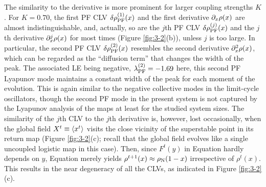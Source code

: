 \documentclass[12pt]{iopart}
\begin{document}
The similarity to the derivative is more prominent
 for larger coupling strengths $K$.
For $K=0.70$, the first PF CLV $\delta\rho_{\rm PF}^{(1)}(x)$
 and the first derivative $\partial_x\rho(x)$ are almost indistinguishable,
 and, actually, so are the $j$th PF CLV $\delta\rho_{\rm PF}^{(j)}(x)$
 and the $j$th derivative $\partial_x^j\rho(x)$ for most times
 (Figure \ref{fig:3-2}(b)), unless $j$ is too large.
In particular, the second PF CLV $\delta\rho_{\rm PF}^{(2)}(x)$ resembles
 the second derivative $\partial_x^2\rho(x)$,
 which can be regarded as the ``diffusion term'' that changes the width
 of the peak.
The associated LE being negative, $\lambda_{\rm PF}^{(2)} = -1.69$ here,
 this second PF Lyapunov mode maintains a constant width of the peak
 for each moment of the evolution.
This is again similar to the negative collective modes
 in the limit-cycle oscillators, though the second PF mode
 in the present system is not captured by the Lyapunov analysis of the maps
 at least for the studied system sizes.
The similarity of the $j$th CLV to the $j$th derivative
 is, however, lost occasionally, when the global field
 $X^t \equiv \langle x^t \rangle$ visits the close vicinity of the superstable
 point in its return map (Figure \ref{fig:3-2}(c); recall that the global field
 evolves like a single uncoupled logistic map in this case).
Then, since $F^t(y)$ in Equation  hardly depends on $y$,
 Equation  merely yields
 $\rho^{t+1}(x) \approx \rho_{\rm N}(1-x)$ irrespective of $\rho^t(x)$.
This results in the near degeneracy of all the CLVs,
 as indicated in Figure \ref{fig:3-2}(c).
\end{document}
